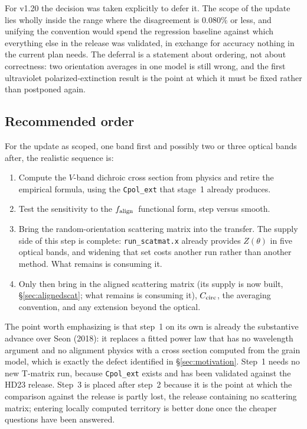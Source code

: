 \documentclass{my_memo}
\newcommand{\code}[1]{\texttt{#1}}
\newcommand{\Ccirc}{\ensuremath{C_{\rm circ}}}
\newcommand{\falign}{\ensuremath{f_{\rm align}}}
\begin{document}
For v1.20 the decision was taken explicitly to defer it. The scope of
the update lies wholly inside the range where the disagreement is
$0.080\%$ or less, and unifying the convention would spend the
regression baseline against which everything else in the release was
validated, in exchange for accuracy nothing in the current plan needs.
The deferral is a statement about ordering, not about correctness: two
orientation averages in one model is still wrong, and the first
ultraviolet polarized-extinction result is the point at which it must be
fixed rather than postponed again.

\subsection{Recommended order}

For the update as scoped, one band first and possibly two or three
optical bands after, the realistic sequence is:

\begin{enumerate}
\item Compute the $V$-band dichroic cross section from physics and
      retire the empirical formula, using the \code{Cpol\_ext} that
      stage~1 already produces.
\item Test the sensitivity to the \falign\ functional form, step versus
      smooth.
\item Bring the random-orientation scattering matrix into the transfer.
      The supply side of this step is complete: \code{run\_scatmat.x}
      already provides $Z(\theta)$ in five optical bands, and widening
      that set costs another run rather than another method. What
      remains is consuming it.
\item Only then bring in the aligned scattering matrix (its supply is now
      built, \S\ref{sec:alignedscat}; what remains is consuming it), \Ccirc,
      the averaging convention, and any extension beyond the optical.
\end{enumerate}

The point worth emphasizing is that step~1 on its own is already the
substantive advance over Seon (2018): it replaces a fitted power law
that has no wavelength argument and no alignment physics with a cross
section computed from the grain model, which is exactly the defect
identified in \S\ref{sec:motivation}. Step~1 needs no new T-matrix run,
because \code{Cpol\_ext} exists and has been validated against the HD23
release. Step~3 is placed after step~2 because it is the point at which
the comparison against the release is partly lost, the release
containing no scattering matrix; entering locally computed territory is
better done once the cheaper questions have been answered.
\end{document}
